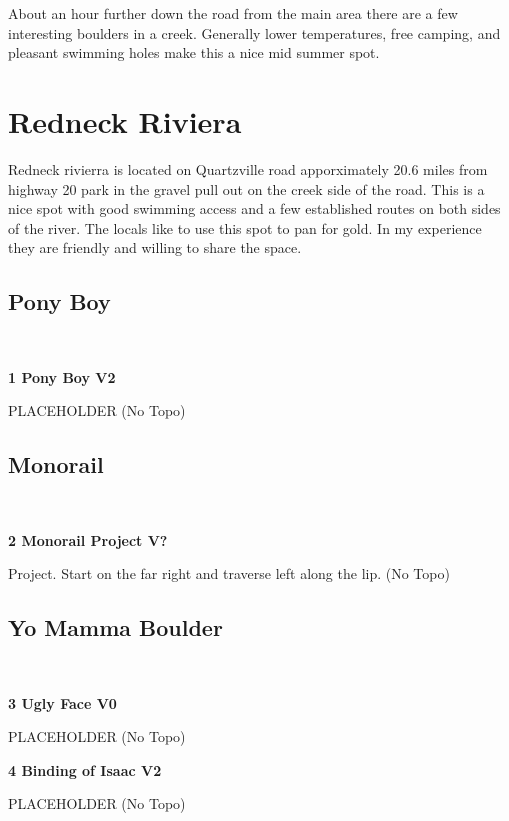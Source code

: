 \begin{multicols*}{2}
About an hour further down the road from the main area there are a few interesting boulders in a creek. Generally lower temperatures, free camping, and pleasant swimming holes make this a nice mid summer spot.

		\section{Redneck Riviera}\label{sa:Redneck Riviera}
	Redneck rivierra is located on Quartzville road apporximately 20.6 miles from highway 20 park in the gravel pull out on the creek side of the road. This is a nice spot with good swimming access and a few established routes on both sides of the river. The locals like to use this spot to pan for gold. In my experience they are friendly and willing to share the space.
			\subsection*{Pony Boy}\label{bf:Pony Boy}
			\
			
					\label{rt:Pony Boy} \colorbox{green!20}{\textbf{1 Pony Boy V2  }}
					\begin{adjustwidth}{1cm}{}
					PLACEHOLDER
						\newline (No Topo) 
					\end{adjustwidth}
			\subsection*{Monorail}\label{bf:Monorail}
			\
			
					\label{rt:Monorail Project} \colorbox{black!20}{\textbf{2 Monorail Project V?  }}
					\begin{adjustwidth}{1cm}{}
					Project. Start on the far right and traverse left along the lip.
						\newline (No Topo) 
					\end{adjustwidth}
			\subsection*{Yo Mamma Boulder}\label{bf:Yo Mamma Boulder}
			\
			
					\label{rt:Ugly Face} \colorbox{green!20}{\textbf{3 Ugly Face V0 \ding{72}  \warn }}
					\begin{adjustwidth}{1cm}{}
					PLACEHOLDER
						\newline (No Topo) 
					\end{adjustwidth}
					\label{rt:Binding of Isaac} \colorbox{green!20}{\textbf{4 Binding of Isaac V2 \ding{72}   \warn }}
					\begin{adjustwidth}{1cm}{}
					PLACEHOLDER
						\newline (No Topo) 
					\end{adjustwidth}

\end{multicols*}
